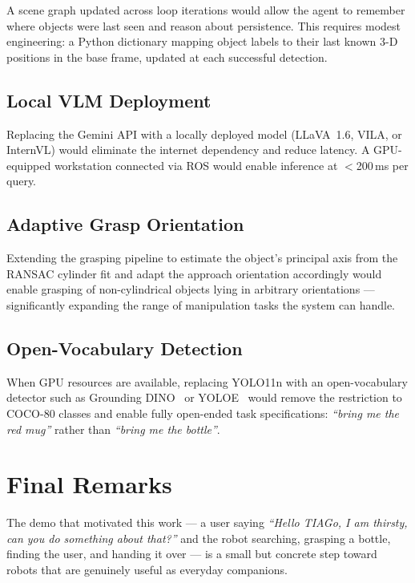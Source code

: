 A scene graph updated across loop iterations would allow the agent to remember where
objects were last seen and reason about persistence.
This requires modest engineering: a Python dictionary mapping object labels to their
last known 3-D positions in the base frame, updated at each successful detection.

\subsection{Local VLM Deployment}

Replacing the Gemini API with a locally deployed model (LLaVA~1.6, VILA, or InternVL)
would eliminate the internet dependency and reduce latency.
A GPU-equipped workstation connected via ROS would enable inference at $<$200\,ms per
query.

\subsection{Adaptive Grasp Orientation}

Extending the grasping pipeline to estimate the object's principal axis from the RANSAC
cylinder fit and adapt the approach orientation accordingly would enable grasping of
non-cylindrical objects lying in arbitrary orientations --- significantly expanding the
range of manipulation tasks the system can handle.

\subsection{Open-Vocabulary Detection}

When GPU resources are available, replacing YOLO11n with an open-vocabulary detector
such as Grounding DINO~\cite{liu2023gdino} or YOLOE~\cite{wang2025yoloe} would remove
the restriction to COCO-80 classes and enable fully open-ended task specifications:
\emph{``bring me the red mug''} rather than \emph{``bring me the bottle''}.

\section{Final Remarks}

The demo that motivated this work --- a user saying \emph{``Hello TIAGo, I am thirsty,
can you do something about that?''} and the robot searching, grasping a bottle, finding
the user, and handing it over --- is a small but concrete step toward robots that are
genuinely useful as everyday companions.

